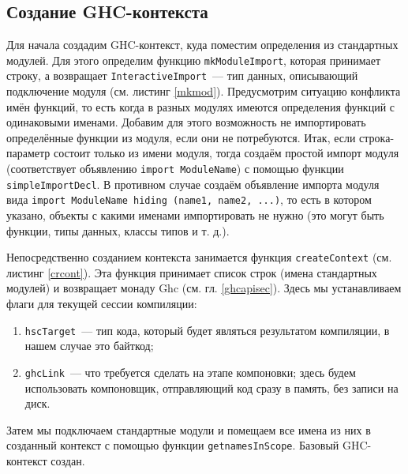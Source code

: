 	\subsection{Создание GHC-контекста}\label{context}
		Для начала создадим GHC-контекст, куда поместим определения из стандартных модулей. Для этого определим функцию \lstinline!mkModuleImport!, которая принимает строку, а возвращает \lstinline!InteractiveImport!~--- тип данных, описывающий подключение модуля (см. листинг \ref{mkmod}). Предусмотрим ситуацию конфликта имён функций, то есть когда в разных модулях имеются определения функций с одинаковыми именами. Добавим для этого возможность не импортировать определённые функции из модуля, если они не потребуются. Итак, если строка-параметр состоит только из имени модуля, тогда создаём простой импорт модуля (соответствует объявлению \lstinline!import ModuleName!) с помощью функции \lstinline!simpleImportDecl!. В противном случае создаём объявление импорта модуля вида \lstinline!import ModuleName hiding (name1, name2, ...)!, то есть в котором указано, объекты с какими именами импортировать не нужно (это могут быть функции, типы данных, классы типов и т. д.).
		
		Непосредственно созданием контекста занимается функция \lstinline!createContext! (см. листинг \ref{crcont}). Эта функция принимает список строк (имена стандартных модулей) и возвращает монаду Ghc (см. гл. \ref{ghcapisec}). Здесь мы устанавливаем флаги для текущей сессии компиляции:
		\begin{enumerate}[1)]
			\item \lstinline!hscTarget!~--- тип кода, который будет являться результатом компиляции, в нашем случае это байткод;
			\item \lstinline!ghcLink!~--- что требуется сделать на этапе компоновки; здесь будем использовать компоновщик, отправляющий код сразу в память, без записи на диск.
		\end{enumerate}
	
		Затем мы подключаем стандартные модули и помещаем все имена из них в созданный контекст с помощью функции \lstinline!getnamesInScope!. Базовый GHC-контекст создан.
		
